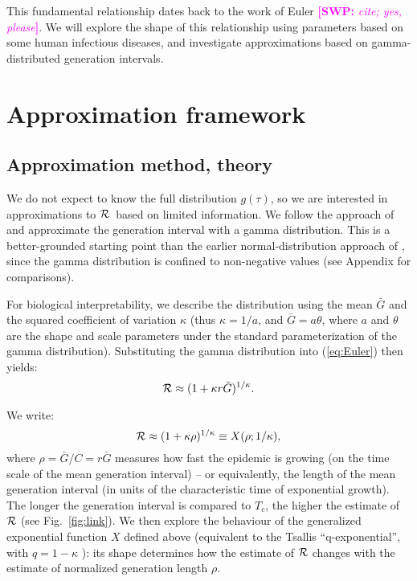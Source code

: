 \documentclass[12pt]{article}
\newcommand{\RR}{\ensuremath{{\cal R}}}
\newcommand{\Tc}{\ensuremath{C}}
\newcommand{\eref}[1]{(\ref{eq:#1})}
\newcommand{\fref}[1]{Fig.~\ref{fig:#1}}
\newcommand{\comment}[3]{\textcolor{#1}{\textbf{[#2: }\textit{#3}\textbf{]}}}
\newcommand{\swp}[1]{\comment{magenta}{SWP}{#1}}
\begin{document}
This fundamental relationship dates back to the work of Euler \swp{cite; yes, please}.
We will explore the shape of this relationship using parameters based on some human infectious diseases, and investigate approximations based on gamma-distributed generation intervals.

\section{Approximation framework}

\subsection{Approximation method, theory}

We do not expect to know the full distribution $g(\tau)$, so we are interested in approximations to \RR\ based on limited information.
We follow the approach of \cite{NishCast09} and approximate the generation interval with a gamma distribution.
This is a better-grounded starting point than the earlier normal-distribution approach of \cite{WallLips07}, since the gamma distribution is confined to non-negative values (see Appendix for comparisons).

For biological interpretability, we describe the distribution using the mean $\bar G$ and the squared coefficient of variation $\kappa$ (thus $\kappa = 1/a$, and $\bar G = a\theta$, where $a$ and $\theta$ are the shape and scale parameters under the standard parameterization of the gamma distribution).
Substituting the gamma distribution into \eref{Euler} then yields:
\begin{equation}
	\RR \approx (1 + \kappa r \bar G)^{1/\kappa}.
	\label{eq:gamApp}
\end{equation}

We write:
\begin{equation}
	\RR \approx (1 + \kappa \rho)^{1/\kappa} \equiv X(\rho; 1/\kappa),
	\label{eq:genExp}
\end{equation}
where $\rho = \bar G/\Tc = r\bar G$ measures how fast the epidemic is growing (on the time scale of the mean generation interval) -- or equivalently, the length of the mean generation interval (in units of the characteristic time of exponential growth).
The longer the generation interval is compared to $T_c$, the higher the estimate of $\RR$ (see \fref{link}).
We then explore the behaviour of the generalized exponential function $X$ defined above (equivalent to the Tsallis ``q-exponential'', with $q=1-\kappa$ \cite{tsallis1994numbers}): its shape determines how the estimate of $\RR$ changes with the estimate of normalized generation length $\rho$.
\end{document}
